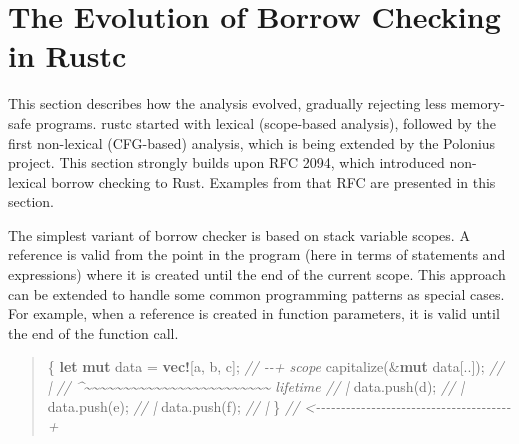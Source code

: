 \documentclass[
  11pt,
  twoside,symmetric]{report}
\newenvironment{Shaded}{}{}
\newcommand{\CharTok}[1]{#1}
\newcommand{\CommentTok}[1]{\textit{#1}}
\newcommand{\KeywordTok}[1]{\textbf{#1}}
\newcommand{\NormalTok}[1]{#1}
\newcommand{\OperatorTok}[1]{#1}
\newcommand{\PreprocessorTok}[1]{\textbf{#1}}
\begin{document}
\section{The Evolution of Borrow Checking in Rustc}\label{sec:evolution}

This section describes how the analysis evolved, gradually rejecting
less memory-safe programs. rustc started with lexical (scope-based
analysis), followed by the first non-lexical (CFG-based) analysis, which
is being extended by the Polonius project. This section strongly builds
upon RFC 2094, which introduced
non-lexical borrow checking to Rust. Examples from that RFC are
presented in this section.

The simplest variant of borrow checker is based on stack variable
scopes. A reference is valid from the point in the program (here in
terms of statements and expressions) where it is created until the end
of the current scope. This approach can be extended to handle some
common programming patterns as special cases. For example, when a
reference is created in function parameters, it is valid until the end
of the function call.

\begin{quote}
\begin{Shaded}
\begin{Highlighting}[]
\OperatorTok{\{}
    \KeywordTok{let} \KeywordTok{mut}\NormalTok{ data }\OperatorTok{=} \PreprocessorTok{vec!}\NormalTok{[}\CharTok{\textquotesingle{}a\textquotesingle{}}\OperatorTok{,} \CharTok{\textquotesingle{}b\textquotesingle{}}\OperatorTok{,} \CharTok{\textquotesingle{}c\textquotesingle{}}\NormalTok{]}\OperatorTok{;} \CommentTok{// {-}{-}+ \textquotesingle{}scope}
\NormalTok{    capitalize(}\OperatorTok{\&}\KeywordTok{mut}\NormalTok{ data[}\OperatorTok{..}\NormalTok{])}\OperatorTok{;}          \CommentTok{//   |}
 \CommentTok{// \^{}\textasciitilde{}\textasciitilde{}\textasciitilde{}\textasciitilde{}\textasciitilde{}\textasciitilde{}\textasciitilde{}\textasciitilde{}\textasciitilde{}\textasciitilde{}\textasciitilde{}\textasciitilde{}\textasciitilde{}\textasciitilde{}\textasciitilde{}\textasciitilde{}\textasciitilde{}\textasciitilde{}\textasciitilde{}\textasciitilde{}\textasciitilde{}\textasciitilde{}\textasciitilde{}\textasciitilde{} \textquotesingle{}lifetime //   |}
\NormalTok{    data}\OperatorTok{.}\NormalTok{push(}\CharTok{\textquotesingle{}d\textquotesingle{}}\NormalTok{)}\OperatorTok{;}                     \CommentTok{//   |}
\NormalTok{    data}\OperatorTok{.}\NormalTok{push(}\CharTok{\textquotesingle{}e\textquotesingle{}}\NormalTok{)}\OperatorTok{;}                     \CommentTok{//   |}
\NormalTok{    data}\OperatorTok{.}\NormalTok{push(}\CharTok{\textquotesingle{}f\textquotesingle{}}\NormalTok{)}\OperatorTok{;}                     \CommentTok{//   |}
\OperatorTok{\}} \CommentTok{// \textless{}{-}{-}{-}{-}{-}{-}{-}{-}{-}{-}{-}{-}{-}{-}{-}{-}{-}{-}{-}{-}{-}{-}{-}{-}{-}{-}{-}{-}{-}{-}{-}{-}{-}{-}{-}{-}{-}{-}{-}+}
\end{Highlighting}
\end{Shaded}
\end{quote}
\end{document}
